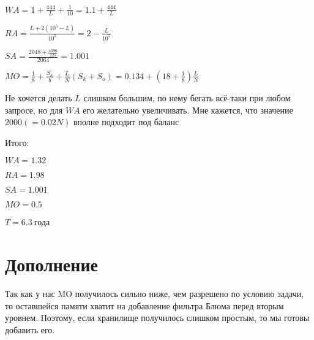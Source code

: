 \large$WA = 1 + \frac{444}{L} + \frac{1}{10} = 1.1 + \frac{444}{L}$\normalsize

\large$RA = \frac{L + 2(10^5-L)}{10^5} = 2 - \frac{L}{10^5}$\normalsize

\large$SA = \frac{2048 + \frac{4096}{225}}{2064} = 1.001$\normalsize

\large$MO = \frac{1}{8} + \frac{S_h}{b} + \frac{L}{N}(S_k + S_o) = 0.134 + (18+\frac{1}{8})\frac{L}{N}$\normalsize

Не хочется делать $L$ слишком большим, по нему бегать всё-таки при любом запросе, но для $WA$ его желательно увеличивать. Мне кажется, что значение $2000 (=0.02N)$ вполне подходит под баланс

Итого:

\large$WA = 1.32$\normalsize

\large$RA = 1.98$\normalsize

\large$SA = 1.001$\normalsize

\large$MO = 0.5$\normalsize

\large$T = 6.3\ $\normalsize года

\section*{Дополнение}

Так как у нас MO получилось сильно ниже, чем разрешено по условию задачи, то оставшейся памяти хватит на добавление фильтра Блюма перед вторым уровнем. Поэтому, если хранилище получилось слишком простым, то мы готовы добавить его.